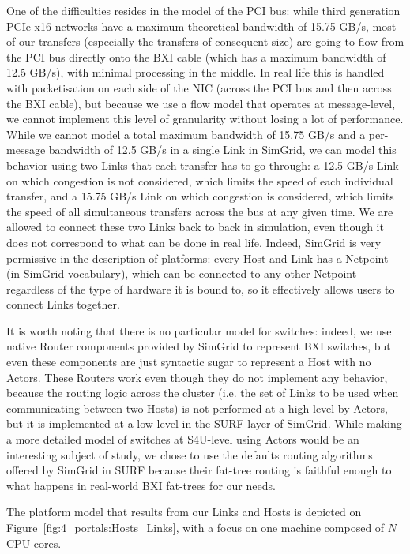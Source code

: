 One of the difficulties resides in the model of the PCI bus: while third
generation PCIe x16 networks have a maximum theoretical bandwidth of 15.75 GB/s,
most of our transfers (especially the transfers of consequent size) are going to
flow from the PCI bus directly onto the BXI cable (which has a maximum bandwidth
of 12.5 GB/s), with minimal processing in the middle. In real life this is
handled with packetisation on each side of the NIC (across the PCI bus and then
across the BXI cable), but because we use a flow model that operates at
message-level, we cannot implement this level of granularity without losing a lot
of performance. While we cannot model a total maximum bandwidth of 15.75 GB/s and
a per-message bandwidth of 12.5 GB/s in a single Link in SimGrid, we can model
this behavior using two Links that each transfer has to go through: a 12.5 GB/s
Link on which congestion is not considered, which limits the speed of each
individual transfer, and a 15.75 GB/s Link on which congestion is considered,
which limits the speed of all simultaneous transfers across the bus at any given
time. We are allowed to connect these two Links back to back in simulation, even
though it does not correspond to what can be done in real life. Indeed, SimGrid
is very permissive in the description of platforms: every Host and Link has a
Netpoint (in SimGrid vocabulary), which can be connected to any other Netpoint
regardless of the type of hardware it is bound to, so it effectively allows
users to connect Links together.

It is worth noting that there is no particular model for switches: indeed, we
use native Router components provided by SimGrid to represent BXI switches, but
even these components are just syntactic sugar to represent a Host with no
Actors. These Routers work even though they do not implement any behavior,
because the routing logic across the cluster (i.e. the set of Links to be used
when communicating between two Hosts) is not performed at a high-level by
Actors, but it is implemented at a low-level in the SURF layer of SimGrid. While
making a more detailed model of switches at S4U-level using Actors would be an
interesting subject of study, we chose to use the defaults routing algorithms
offered by SimGrid in SURF because their fat-tree routing is faithful enough to
what happens in real-world BXI fat-trees for our needs.

The platform model that results from our Links and Hosts is depicted on
Figure~\ref{fig:4_portals:Hosts_Links}, with a focus on one machine composed of
$N$ CPU cores.

